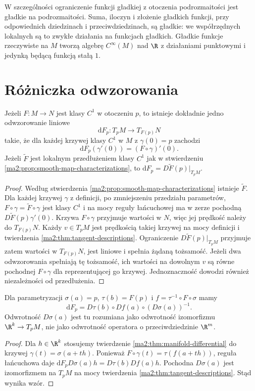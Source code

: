 W szczególności ograniczenie funkcji gładkiej z otoczenia
podrozmaitości jest gładkie na podrozmaitości. Suma,
iloczyn i złożenie gładkich funkcji, przy odpowiednich
dziedzinach i przeciwdziedzinach, są gładkie: we
współrzędnych lokalnych są to zwykłe działania na
funkcjach gładkich. Gładkie funkcje rzeczywiste na $M$
tworzą algebrę $C^\infty(M)$ nad $\R$ z działaniami
punktowymi i jedynką będącą funkcją stałą $1$.

\section{Różniczka odwzorowania}

\begin{twierdzenie}
\label{ma2:thm:manifold-differential}
Jeżeli $F:M\to N$ jest klasy $C^1$ w otoczeniu $p$,
to istnieje dokładnie jedno odwzorowanie liniowe
\[
 \mathrm dF_p:T_pM\to T_{F(p)}N
\]
takie, że dla każdej krzywej klasy $C^1$ w $M$
z $\gamma(0)=p$ zachodzi
\[
 \mathrm dF_p(\gamma'(0))=(F\circ\gamma)'(0).
\]
Jeżeli $\widetilde F$ jest lokalnym przedłużeniem klasy
$C^1$ jak w stwierdzeniu
\ref{ma2:prop:smooth-map-characterizations}, to
$\mathrm dF_p=D\widetilde F(p)|_{T_pM}$.
\end{twierdzenie}
\begin{proof}
Według stwierdzenia \ref{ma2:prop:smooth-map-characterizations}
istnieje $\widetilde F$. Dla każdej krzywej $\gamma$
z definicji, po zmniejszeniu przedziału parametrów,
$F\circ\gamma=\widetilde F\circ\gamma$ jest klasy $C^1$
i na mocy reguły łańcuchowej ma w zerze pochodną
$D\widetilde F(p)\gamma'(0)$. Krzywa $F\circ\gamma$
przyjmuje wartości w $N$, więc jej prędkość należy do
$T_{F(p)}N$. Każdy $v\in T_pM$ jest prędkością
takiej krzywej na mocy definicji i twierdzenia
\ref{ma2:thm:tangent-descriptions}. Ograniczenie
$D\widetilde F(p)|_{T_pM}$ przyjmuje zatem wartości w
$T_{F(p)}N$, jest liniowe i spełnia żądaną tożsamość.
Jeżeli dwa odwzorowania spełniają tę tożsamość, ich
wartości na dowolnym $v$ są równe pochodnej
$F\circ\gamma$ dla reprezentującej go krzywej.
Jednoznaczność dowodzi również niezależności od
przedłużenia.
\end{proof}

\begin{wniosek}
\label{ma2:cor:manifold-coordinate-differential}
Dla parametryzacji $\sigma(a)=p$, $\tau(b)=F(p)$ i
$f=\tau^{-1}\circ F\circ\sigma$ mamy
\[
 \mathrm dF_p=D\tau(b)\circ Df(a)\circ
              (D\sigma(a))^{-1}.
\]
Odwrotność $D\sigma(a)$ jest tu rozumiana jako odwrotność
izomorfizmu $\R^k\to T_pM$, nie jako odwrotność operatora
o przeciwdziedzinie $\R^m$.
\end{wniosek}
\begin{proof}
Dla $h\in\R^k$ stosujemy twierdzenie
\ref{ma2:thm:manifold-differential} do krzywej
$\gamma(t)=\sigma(a+th)$. Ponieważ
$F\circ\gamma(t)=\tau(f(a+th))$, reguła łańcuchowa
daje $\mathrm dF_p D\sigma(a)h=D\tau(b)Df(a)h$.
Pochodna $D\sigma(a)$ jest izomorfizmem na $T_pM$ na
mocy twierdzenia \ref{ma2:thm:tangent-descriptions}.
Stąd wynika wzór.
\end{proof}

